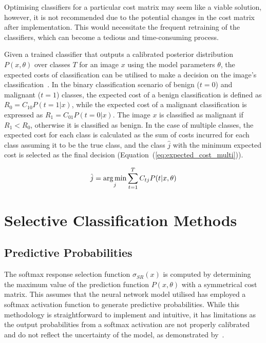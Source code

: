 Optimising classifiers for a particular cost matrix may seem like a viable solution, however, it is not recommended due to the potential changes in the cost matrix after implementation. This would necessitate the frequent retraining of the classifiers, which can become a tedious and time-consuming process.

Given a trained classifier that outputs a calibrated posterior distribution $P(x, \theta)$ over classes $T$ for an image $x$ using the model parameters $\theta$, the expected costs of classification can be utilised to make a decision on the image's classification~\citep{ferrer2022analysis}. In the binary classification scenario of benign ($t=0$) and malignant ($t=1$) classes, the expected cost of a benign classification is defined as $R_0 = C_{10} P(t=1|x)$, while the expected cost of a malignant classification is expressed as $R_1 = C_{01} P(t=0|x)$. The image $x$ is classified as malignant if $R_1 < R_0$, otherwise it is classified as benign. In the case of multiple classes, the expected cost for each class is calculated as the sum of costs incurred for each class assuming it to be the true class, and the class $\hat{j}$ with the minimum expected cost is selected as the final decision (Equation~(\ref{eq:expected_cost_multi})).

\begin{equation}
	\hat{j} = \operatorname*{arg\,min}_j\sum^T_{t=1}C_{tj}P(t|x,\theta)
	\label{eq:expected_cost_multi}
\end{equation}



\section{Selective Classification Methods}
\label{sec:slective_classification_methods}

\subsection{Predictive Probabilities}
\label{subsec:selective_predictive_probabilites}
The softmax response selection function $\sigma_{SR}(x)$ is computed by determining the maximum value of the prediction function $P(x, \theta)$ with a symmetrical cost matrix. This assumes that the neural network model utilised has employed a softmax activation function to generate predictive probabilities. While this methodology is straightforward to implement and intuitive, it has limitations as the output probabilities from a softmax activation are not properly calibrated and do not reflect the uncertainty of the model, as demonstrated by~\cite{gal2016dropout}.

